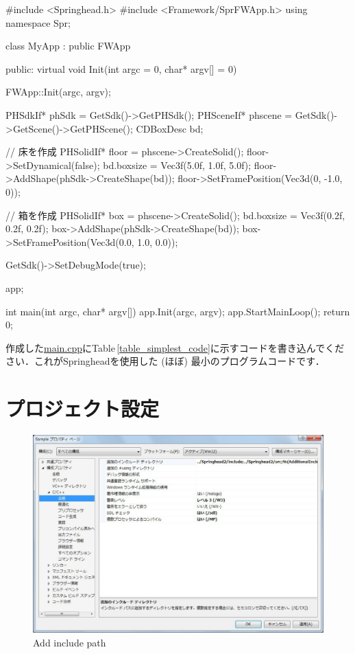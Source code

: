 \begin{table}[t]
\caption{Simplest program code}
\label{table_simplest_code}
{\small
\begin{sourcecode}
#include <Springhead.h>
#include <Framework/SprFWApp.h>
using namespace Spr;

class MyApp : public FWApp{
public:
    virtual void Init(int argc = 0, char* argv[] = 0){
        FWApp::Init(argc, argv);

        PHSdkIf* phSdk = GetSdk()->GetPHSdk();
        PHSceneIf* phscene = GetSdk()->GetScene()->GetPHScene();
        CDBoxDesc bd;
        
        // 床を作成
        PHSolidIf* floor = phscene->CreateSolid();
        floor->SetDynamical(false);
        bd.boxsize = Vec3f(5.0f, 1.0f, 5.0f);
        floor->AddShape(phSdk->CreateShape(bd));
        floor->SetFramePosition(Vec3d(0, -1.0, 0));
    
        // 箱を作成
        PHSolidIf* box = phscene->CreateSolid();
        bd.boxsize = Vec3f(0.2f, 0.2f, 0.2f);
        box->AddShape(phSdk->CreateShape(bd));
        box->SetFramePosition(Vec3d(0.0, 1.0, 0.0));

        GetSdk()->SetDebugMode(true);
    }
} app;

int main(int argc, char* argv[]){
    app.Init(argc, argv);
    app.StartMainLoop();
    return 0;
}
\end{sourcecode}
}
\end{table}

\KLUDGE 作成した\url{main.cpp}にTable\,\ref{table_simplest_code}に示すコードを書き込んでください．これがSpringheadを使用した (ほぼ) 最小のプログラムコードです．

\section*{プロジェクト設定}

\begin{figure}[t]
\begin{center}
\includegraphics[width=.6\hsize]{fig/newproject4.eps}
\end{center}
\caption{Add include path}
\label{fig_newproject4}
\end{figure}


